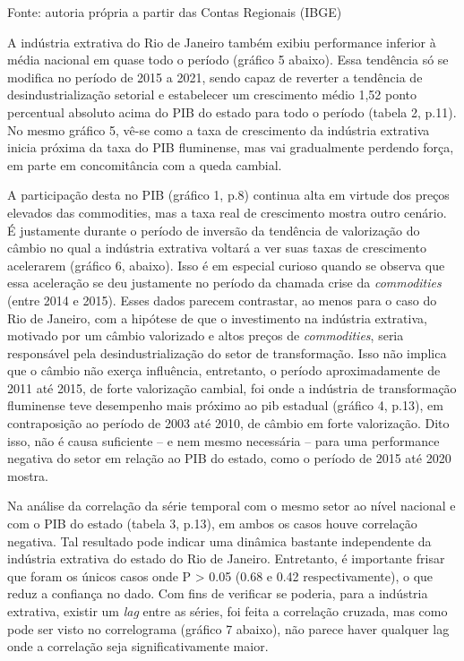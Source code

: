 Fonte: autoria própria a partir das Contas Regionais (IBGE)

A indústria extrativa do Rio de Janeiro também exibiu performance
inferior à média nacional em quase todo o período (gráfico 5 abaixo).
Essa tendência só se modifica no período de 2015 a 2021, sendo capaz de
reverter a tendência de desindustrialização setorial e estabelecer um
crescimento médio 1,52 ponto percentual absoluto acima do PIB do estado
para todo o período (tabela 2, p.11). No mesmo gráfico 5, vê-se como a
taxa de crescimento da indústria extrativa inicia próxima da taxa do PIB
fluminense, mas vai gradualmente perdendo força, em parte em
concomitância com a queda cambial.

A participação desta no PIB (gráfico 1, p.8) continua alta em virtude
dos preços elevados das commodities, mas a taxa real de crescimento
mostra outro cenário. É justamente durante o período de inversão da
tendência de valorização do câmbio no qual a indústria extrativa voltará
a ver suas taxas de crescimento acelerarem (gráfico 6, abaixo). Isso é
em especial curioso quando se observa que essa aceleração se deu
justamente no período da chamada crise da \emph{commodities} (entre 2014
e 2015). Esses dados parecem contrastar, ao menos para o caso do Rio de
Janeiro, com a hipótese de que o investimento na indústria extrativa,
motivado por um câmbio valorizado e altos preços de \emph{commodities},
seria responsável pela desindustrialização do setor de transformação.
Isso não implica que o câmbio não exerça influência, entretanto, o
período aproximadamente de 2011 até 2015, de forte valorização cambial,
foi onde a indústria de transformação fluminense teve desempenho mais
próximo ao pib estadual (gráfico 4, p.13), em contraposição ao período
de 2003 até 2010, de câmbio em forte valorização. Dito isso, não é causa
suficiente -- e nem mesmo necessária -- para uma performance negativa do
setor em relação ao PIB do estado, como o período de 2015 até 2020
mostra.

Na análise da correlação da série temporal com o mesmo setor ao nível
nacional e com o PIB do estado (tabela 3, p.13), em ambos os casos houve
correlação negativa. Tal resultado pode indicar uma dinâmica bastante
independente da indústria extrativa do estado do Rio de Janeiro.
Entretanto, é importante frisar que foram os únicos casos onde P
\textgreater{} 0.05 (0.68 e 0.42 respectivamente), o que reduz a
confiança no dado. Com fins de verificar se poderia, para a indústria
extrativa, existir um \emph{lag} entre as séries, foi feita a correlação
cruzada, mas como pode ser visto no correlograma (gráfico 7 abaixo), não
parece haver qualquer lag onde a correlação seja significativamente
maior.

